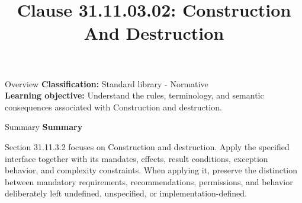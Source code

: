 \documentclass[10pt,letterpaper]{article}
\title{Clause 31.11.03.02: Construction And Destruction}
\author{}
\date{}
\begin{document}
\maketitle
\begin{CornellOverviewBox}{Overview}
\textbf{Classification:} Standard library - Normative\\[2pt]
\textbf{Learning objective:} Understand the rules, terminology, and semantic consequences associated with Construction and destruction.
\end{CornellOverviewBox}\begin{CornellSummaryBox}{Summary}
{\sffamily\bfseries\color{Accent} Summary}\par\vspace{3pt}Section 31.11.3.2 focuses on Construction and destruction. Apply the specified interface together with its mandates, effects, result conditions, exception behavior, and complexity constraints. When applying it, preserve the distinction between mandatory requirements, recommendations, permissions, and behavior deliberately left undefined, unspecified, or implementation-defined.
\end{CornellSummaryBox}
\end{document}

